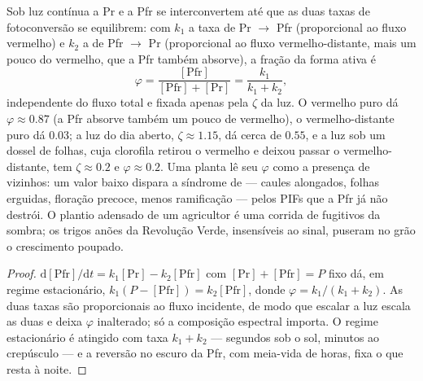 \begin{proposition}\label{prop:b3:plant-molecular-physiology:photoequilibrium}
Sob luz contínua a Pr e a Pfr se interconvertem até que as duas taxas de
fotoconversão se equilibrem: com $k_{1}$ a taxa de Pr $\to$ Pfr
(proporcional ao fluxo vermelho) e $k_{2}$ a de Pfr $\to$ Pr
(proporcional ao fluxo vermelho-distante, mais um pouco do vermelho, que
a Pfr também absorve), a fração da forma ativa é
\[
\varphi = \frac{[\text{Pfr}]}{[\text{Pfr}] + [\text{Pr}]} = \frac{k_{1}}{k_{1} + k_{2}},
\]
independente do fluxo total e fixada apenas pela \emph{} $\zeta$ da luz. O vermelho puro dá $\varphi \approx 0.87$ (a Pfr absorve também um pouco de vermelho), o
vermelho-distante puro dá $0.03$; a luz do dia aberto, $\zeta \approx
1.15$, dá cerca de $0.55$, e a luz sob um dossel de folhas, cuja
clorofila retirou o vermelho e deixou passar o vermelho-distante, tem
$\zeta \approx 0.2$ e $\varphi \approx 0.2$. Uma planta lê seu $\varphi$
como a presença de vizinhos: um valor baixo dispara a síndrome de
\emph{} --- caules alongados, folhas erguidas, floração
precoce, menos ramificação --- pelos PIFs que a Pfr já não destrói. O
plantio adensado de um agricultor é uma corrida de fugitivos da sombra;
os trigos anões da Revolução Verde, insensíveis ao sinal, puseram no
grão o crescimento poupado.
\end{proposition}
\begin{proof}
$\mathrm{d}[\text{Pfr}]/\mathrm{d}t = k_{1}[\text{Pr}] - k_{2}[\text{Pfr}]$
com $[\text{Pr}] + [\text{Pfr}] = P$ fixo dá, em regime estacionário,
$k_{1}(P - [\text{Pfr}]) = k_{2}[\text{Pfr}]$, donde $\varphi = k_{1}/
(k_{1} + k_{2})$. As duas taxas são proporcionais ao fluxo incidente, de
modo que escalar a luz escala as duas e deixa $\varphi$ inalterado; só a
composição espectral importa. O regime estacionário é atingido com taxa
$k_{1} + k_{2}$ --- segundos sob o sol, minutos ao crepúsculo --- e a
reversão no escuro da Pfr, com meia-vida de horas, fixa o que resta à
noite.
\end{proof}

